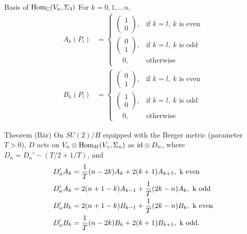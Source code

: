 \documentclass{beamer}
\def\C{{\mathbb C}}
\def\Hom{{\rm Hom}}
\def\id{{\rm id}}
\begin{document}
\begin{frame}
	\begin{block}{Basis of $\Hom_{\C}(V_n, \Sigma_3)$}
	For $k = 0,1,\ldots n$,
	\begin{align*}
A_k(P_l) & = \begin{cases}
\left( \begin{array}{c}
1\\
0
\end{array} \right),
 & \mbox{if } k=l,~k\mbox{ is even} \\
\left( \begin{array}{c}
0\\
1
\end{array} \right),
& \mbox{if } k=l,~k\mbox{ is odd}\\
\quad 0,
& \mbox{otherwise}
 \end{cases} \\
B_k(P_l) & = \begin{cases}
\left( \begin{array}{c}
0\\
1
\end{array} \right),
 & \mbox{if } k=l,~k\mbox{ is even} \\
\left( \begin{array}{c}
1\\
0
\end{array} \right),
& \mbox{if } k=l,~k\mbox{ is odd}\\
\quad 0,
& \mbox{otherwise}
 \end{cases}
\end{align*}
	\end{block}
\end{frame}

\begin{frame}
	\begin{block}{Theorem (B\"ar)}
		On $SU(2)/ H$ equipped with the Berger metric (parameter $T>0$), $D$ acts on $V_n \otimes \Hom_{H}(V_{\gamma},\Sigma_n)$ as $\id \otimes D_n$, where $D_n = D_n' -(T/2 + 1/T)$, and
	\begin{align*}
	D_n ' A_k & = \frac{1}{T}(n-2k)A_k + 2(k+1)A_{k+1},~\rm{k~even} \\
	D_n ' A_k & = 2(n+1-k) A_{k-1} + \frac{1}{T}(2k - n)A_k,~\rm{k~odd}\\
	D_n ' B_k & = 2(n+1-k) B_{k-1} + \frac{1}{T}(2k - n)B_k,~\rm{k~even}\\
	D_n ' B_k & = \frac{1}{T}(n-2k)B_k + 2(k+1)B_{k+1},~\rm{k~odd}.
	\end{align*}	
	\end{block}
\end{frame}
\end{document}
